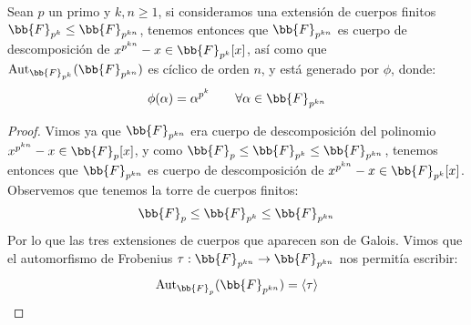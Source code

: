\begin{teo}
    Sean $p$ un primo y $k,n\geq 1$, si consideramos una extensión de cuerpos finitos $\bb{F}_{p^k}\leq \bb{F}_{p^{kn}}$, tenemos entonces que $\bb{F}_{p^{kn}}$ es cuerpo de descomposición de $x^{p^{kn}}-x\in \bb{F}_{p^k}[x]$, así como que $\Aut_{\bb{F}_{p^k}}(\bb{F}_{p^{kn}})$ es cíclico de orden $n$, y está generado por $\phi$, donde:
    \begin{equation*}
        \phi(\alpha) = \alpha^{p^k} \qquad \forall \alpha \in \bb{F}_{p^{kn}}
    \end{equation*}
    \begin{proof}
        Vimos ya que $\bb{F}_{p^{kn}}$ era cuerpo de descomposición del polinomio $x^{p^{kn}}-x\in \bb{F}_p[x]$, y como $\bb{F}_p \leq \bb{F}_{p^k} \leq \bb{F}_{p^{kn}}$, tenemos entonces que $\bb{F}_{p^{kn}}$ es cuerpo de descomposición de $x^{p^{kn}}-x\in \bb{F}_{p^k}[x]$.\\

        \noindent
        Observemos que tenemos la torre de cuerpos finitos:
        \begin{equation*}
            \bb{F}_p \leq \bb{F}_{p^k} \leq \bb{F}_{p^{kn}}
        \end{equation*}
        Por lo que las tres extensiones de cuerpos que aparecen son de Galois. Vimos que el automorfismo de Frobenius $\tau:\bb{F}_{p^{kn}}\to \bb{F}_{p^{kn}}$ nos permitía escribir:
        \begin{equation*}
            \Aut_{\bb{F}_p}(\bb{F}_{p^{kn}}) = \langle \tau \rangle 
        \end{equation*}


\end{proof}
\end{teo}
